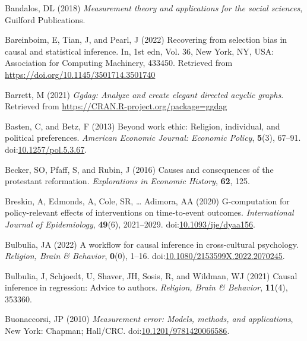 \documentclass[
  singlecolumn]{article}
\newlength{\cslhangindent}
\newenvironment{CSLReferences}[2] %
 {\begin{list}{}{%
  \setlength{\itemindent}{0pt}
  \setlength{\leftmargin}{0pt}
  \setlength{\parsep}{0pt}
  \ifodd #1
   \setlength{\leftmargin}{\cslhangindent}
   \setlength{\itemindent}{-1\cslhangindent}
  \fi
  \setlength{\itemsep}{#2\baselineskip}}}
 {\end{list}}
\begin{document}
\label{refs}
\begin{CSLReferences}{1}{0}
Bandalos, DL (2018) \emph{Measurement theory and applications for the
social sciences}, Guilford Publications.

Bareinboim, E, Tian, J, and Pearl, J (2022) Recovering from selection
bias in causal and statistical inference. In, 1st edn, Vol. 36, New
York, NY, USA: Association for Computing Machinery, 433450. Retrieved
from \url{https://doi.org/10.1145/3501714.3501740}

Barrett, M (2021) \emph{Ggdag: Analyze and create elegant directed
acyclic graphs}. Retrieved from
\url{https://CRAN.R-project.org/package=ggdag}

Basten, C, and Betz, F (2013) Beyond work ethic: Religion, individual,
and political preferences. \emph{American Economic Journal: Economic
Policy}, \textbf{5}(3), 67--91.
doi:\href{https://doi.org/10.1257/pol.5.3.67}{10.1257/pol.5.3.67}.

Becker, SO, Pfaff, S, and Rubin, J (2016) Causes and consequences of the
protestant reformation. \emph{Explorations in Economic History},
\textbf{62}, 125.

Breskin, A, Edmonds, A, Cole, SR, \ldots{} Adimora, AA (2020)
G-computation for policy-relevant effects of interventions on
time-to-event outcomes. \emph{International Journal of Epidemiology},
\textbf{49}(6), 2021--2029.
doi:\href{https://doi.org/10.1093/ije/dyaa156}{10.1093/ije/dyaa156}.

Bulbulia, JA (2022) A workflow for causal inference in cross-cultural
psychology. \emph{Religion, Brain \& Behavior}, \textbf{0}(0), 1--16.
doi:\href{https://doi.org/10.1080/2153599X.2022.2070245}{10.1080/2153599X.2022.2070245}.

Bulbulia, J, Schjoedt, U, Shaver, JH, Sosis, R, and Wildman, WJ (2021)
Causal inference in regression: Advice to authors. \emph{Religion, Brain
\& Behavior}, \textbf{11}(4), 353360.

Buonaccorsi, JP (2010) \emph{Measurement error: Models, methods, and
applications}, New York: Chapman; Hall/CRC.
doi:\href{https://doi.org/10.1201/9781420066586}{10.1201/9781420066586}.


\end{CSLReferences}
\end{document}
